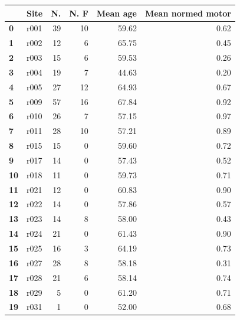 \documentclass[10pt]{article}
\begin{document}
\begin{table}
\begin{tabular}{|l|l|r|r|r|r|}
\hline {} &  Site &   N. &  N. F &  Mean age &  Mean normed motor \\ \hline
\textbf{0 } &  r001 &  39 &         10 &     59.62 &               0.62 \\ 
\textbf{1 } &  r002 &  12 &          6 &     65.75 &               0.45 \\
\textbf{2 } &  r003 &  15 &          6 &     59.53 &               0.26 \\ 
\textbf{3 } &  r004 &  19 &          7 &     44.63 &               0.20 \\ 
\textbf{4 } &  r005 &  27 &         12 &     64.93 &               0.67 \\
\textbf{5 } &  r009 &  57 &         16 &     67.84 &               0.92 \\ 
\textbf{6 } &  r010 &  26 &          7 &     57.15 &               0.97 \\ 
\textbf{7 } &  r011 &  28 &         10 &     57.21 &               0.89 \\ 
\textbf{8 } &  r015 &  15 &          0 &     59.60 &               0.72 \\ 
\textbf{9 } &  r017 &  14 &          0 &     57.43 &               0.52 \\
\textbf{10} &  r018 &  11 &          0 &     59.73 &               0.71 \\ 
\textbf{11} &  r021 &  12 &          0 &     60.83 &               0.90 \\
\textbf{12} &  r022 &  14 &          0 &     57.86 &               0.57 \\ 
\textbf{13} &  r023 &  14 &          8 &     58.00 &               0.43 \\ 
\textbf{14} &  r024 &  21 &          0 &     61.43 &               0.90 \\ 
\textbf{15} &  r025 &  16 &          3 &     64.19 &               0.73 \\ 
\textbf{16} &  r027 &  28 &          8 &     58.18 &               0.31 \\
\textbf{17} &  r028 &  21 &          6 &     58.14 &               0.74 \\
\textbf{18} &  r029 &   5 &          0 &     61.20 &               0.71 \\ 
\textbf{19} &  r031 &   1 &          0 &     52.00 &               0.68 \\ 

\end{tabular}
\end{table}
\end{document}
